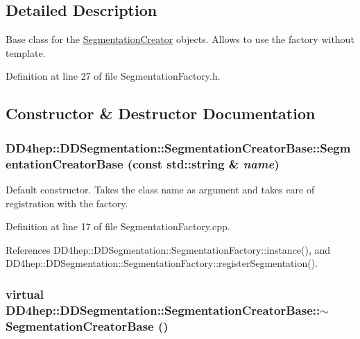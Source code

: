 \subsection{Detailed Description}
Base class for the \hyperlink{class_d_d4hep_1_1_d_d_segmentation_1_1_segmentation_creator}{SegmentationCreator} objects. Allows to use the factory without template. 

Definition at line 27 of file SegmentationFactory.h.

\subsection{Constructor \& Destructor Documentation}
\hypertarget{class_d_d4hep_1_1_d_d_segmentation_1_1_segmentation_creator_base_aaea0ce7f18f4a00718586fde3b214aaa}{
\subsubsection[{SegmentationCreatorBase}]{\setlength{\rightskip}{0pt plus 5cm}DD4hep::DDSegmentation::SegmentationCreatorBase::SegmentationCreatorBase (const std::string \& {\em name})}}
\label{class_d_d4hep_1_1_d_d_segmentation_1_1_segmentation_creator_base_aaea0ce7f18f4a00718586fde3b214aaa}


Default constructor. Takes the class name as argument and takes care of registration with the factory. 

Definition at line 17 of file SegmentationFactory.cpp.

References DD4hep::DDSegmentation::SegmentationFactory::instance(), and DD4hep::DDSegmentation::SegmentationFactory::registerSegmentation().\hypertarget{class_d_d4hep_1_1_d_d_segmentation_1_1_segmentation_creator_base_aa389c741b4df8a82ff944fed42b3dbf7}{
\subsubsection[{$\sim$SegmentationCreatorBase}]{\setlength{\rightskip}{0pt plus 5cm}virtual DD4hep::DDSegmentation::SegmentationCreatorBase::$\sim$SegmentationCreatorBase ()}}
\label{class_d_d4hep_1_1_d_d_segmentation_1_1_segmentation_creator_base_aa389c741b4df8a82ff944fed42b3dbf7}


